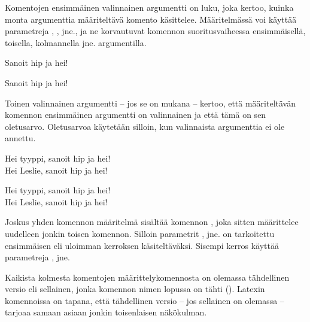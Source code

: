 \noindent
Komentojen ensimmäinen valinnainen argumentti  on luku, joka
kertoo, kuinka monta argumenttia määriteltävä komento käsittelee.
Määritelmässä voi käyttää parametreja , ,
 jne., ja ne korvautuvat komennon suoritusvaiheessa
ensimmäisellä, toisella, kolmannella jne. argumentilla.

\begin{koodilohkosis}
\newcommand{\komento}[2]{Sanoit #1 ja #2!}
\komento{hip}{hei}
\end{koodilohkosis}

\begin{tulossis}
  Sanoit hip ja hei!
\end{tulossis}

\noindent
Toinen valinnainen argumentti  -- jos se on mukana --
kertoo, että määriteltävän komennon ensimmäinen argumentti on
valinnainen ja että tämä on sen oletusarvo. Oletusarvoa käytetään
silloin, kun valinnaista argumenttia ei ole annettu.

\begin{koodilohkosis}
\newcommand{\komento}[3][tyyppi]{Hei #1, sanoit #2 ja #3!}
\komento{hip}{hei} \\
\komento[Leslie]{hip}{hei}
\end{koodilohkosis}

\begin{tulossis}
  Hei tyyppi, sanoit hip ja hei! \\
  Hei Leslie, sanoit hip ja hei!
\end{tulossis}

\noindent
Joskus yhden komennon määritelmä sisältää komennon
, joka sitten määrittelee uudelleen jonkin toisen
komennon. Silloin parametrit ,  jne. on
tarkoitettu ensimmäisen eli uloimman kerroksen käsiteltäväksi. Sisempi
kerros käyttää parametreja ,  jne.

Kaikista kolmesta komentojen määrittelykomennosta on olemassa
tähdellinen versio eli sellainen, jonka komennon nimen lopussa on tähti
(\koodi{*}). Latexin komennoissa on tapana, että tähdellinen versio --
jos sellainen on olemassa -- tarjoaa samaan asiaan jonkin toisenlaisen
näkökulman.

\begin{koodilohkosis}
\newcommand*     {\nimi}[n][oletus]{määritelmä}
\renewcommand*   {\nimi}[n][oletus]{määritelmä}
\providecommand* {\nimi}[n][oletus]{määritelmä}
\end{koodilohkosis}

